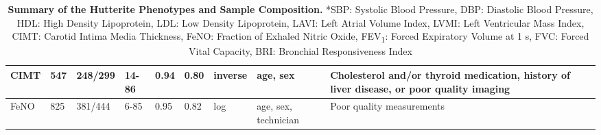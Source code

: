 \begin{landscape}
\begin{table}
\begin{adjustbox}{width={\textwidth}}
\begin{tabular}{@{}p{2.5cm}|p{1cm}p{2cm}p{2cm}p{1cm}p{1cm}p{4cm}p{3cm}|p{5cm}@{}}
CIMT & 547 & 248/299 & 	14-86 & 	0.94 & 	0.80 & 	inverse & 	age, sex	 & Cholesterol and/or thyroid medication, history of liver disease, or poor quality imaging \\ \hline
FeNO & 825 & 381/444 & 	6-85 & 	0.95 & 	0.82 & 	log & 	age, sex, technician	 & Poor quality measurements  \\ \bottomrule
\end{tabular}
\end{adjustbox}
\caption[Summary of the Hutterite Phenotypes and Sample Composition. ]{\textbf{Summary of the Hutterite Phenotypes and Sample Composition.} *SBP: Systolic Blood Pressure, DBP: Diastolic Blood Pressure, HDL: High Density Lipoprotein, LDL: Low Density Lipoprotein, LAVI: Left Atrial Volume Index, LVMI: Left Ventricular Mass Index, CIMT: Carotid Intima Media Thickness, FeNO: Fraction of Exhaled Nitric Oxide, FEV\textsubscript{1}: Forced Expiratory Volume at 1 s, FVC: Forced Vital Capacity, BRI: Bronchial Responsiveness Index}
\label{tab:tab-s1a}
\end{table}



\end{landscape}
